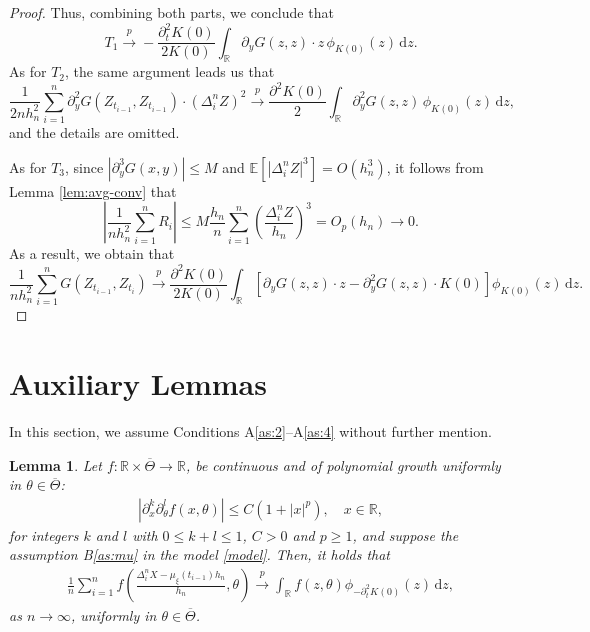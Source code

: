 \documentclass[a4paper,10pt,twoside]{article}
\newtheorem{lem}{Lemma}[section]
\numberwithin{equation}{section}
\def\R{\mathbb{R}}
\def\D{\Delta}
\def\l{\left}
\def\r{\right}
\def\th{\theta}
\def\p{\partial}
\def\toP{\stackrel{p}{\longrightarrow}}
\def\E{\mathbb{E}}
\def\ol#1{\overline{#1}}
\def\df{\mathrm{d}}
\begin{document}
\begin{proof}
Thus, combining both parts, we conclude that 
\[
T_1 \toP -\frac{\p_t^2 K(0)}{2 K(0)} \int_{\mathbb{R}} \p_y G(z,z) \cdot z \, \phi_{K(0)}(z) \,\df z.
\]
As for $T_2$, the same argument leads us that 
\[
\frac{1}{2n h_n^2} \sum_{i=1}^n \p_y^2 G(Z_{t_{i-1}}, Z_{t_{i-1}}) \cdot (\Delta_i^n Z)^2
\toP \frac{\p^2 K(0)}{2} \int_{\mathbb{R}} \p_y^2 G(z,z) \, \phi_{K(0)}(z) \,\df z, 
\]
and the details are omitted. 

As for $T_3$, since $|\p_y^3 G(x,y)| \le M$ and $\E[|\Delta_i^n Z|^3] = O(h_n^3)$, it follows from Lemma \ref{lem:avg-conv} that 
\[
\l|\frac{1}{n h_n^2} \sum_{i=1}^n R_i \r| \le M \frac{h_n}{n}\sum_{i=1}^n \l(\frac{\D_i^n Z}{h_n}\r)^3=O_p(h_n) \to 0.
\]
As a result, we obtain that 
\[
\frac{1}{n h_n^2} \sum_{i=1}^n G(Z_{t_{i-1}}, Z_{t_i}) 
\toP \frac{\p^2 K(0)}{2 K(0)} \int_{\mathbb{R}} \l[ \p_y G(z,z) \cdot z - \p_y^2 G(z,z) \cdot K(0) \r] \phi_{K(0)}(z) \,\df z.
\]
\end{proof}



\section{Auxiliary Lemmas}\label{app:B}
In this section, we assume Conditions A\ref{as:2}--A\ref{as:4} without further mention.

\begin{lem}\label{lem:f-DX}
Let $f:\mathbb{R}\times \ol{\Theta} \to \mathbb{R}$, be continuous and of polynomial growth uniformly in $\th \in \ol{\Theta}$:
\begin{align}
|\p^k_x\p_\th^lf(x,\th)| \le C(1 + |x|^p), \quad  x \in \mathbb{R},  \label{cond:f-DX}
\end{align}
for integers $k$ and $l$ with $0\le k+l\le 1$, $C>0$ and $p \ge 1$, and suppose the assumption B\ref{as:mu} in the model \eqref{model}. 
Then, it holds that 
\begin{align*}
\frac{1}{n} \sum_{i=1}^n f \l(\frac{\D_i^n X - \mu_\xi(t_{i-1}) h_n}{h_n},\th\r) \toP \int_\R f(z,\th) \phi_{-\p^2_t K(0)}(z)\,\df z, 
\end{align*}
as $n\to \infty$, uniformly in $\th \in \ol{\Theta}$. 
\end{lem}
\end{document}
